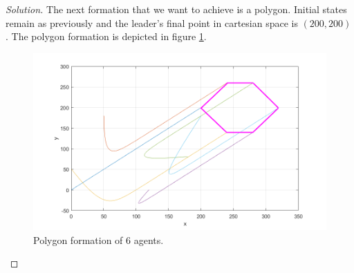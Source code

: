 \documentclass[12pt]{article}
\newenvironment{solution}{\begin{proof}[Solution]}{\end{proof}}
\begin{document}
\begin{solution}
The next formation that we want to achieve is a polygon. Initial states remain as previously and the leader's final point in cartesian space is $(200,200)$. The polygon formation is depicted in figure \ref{polygon_xy}.  
\begin{figure}[!h]
	\includegraphics[scale=0.6]{figures/PolygonFormation.png}
	\centering
	\caption{Polygon formation of 6 agents.}
	\label{polygon_xy}
\end{figure}


\end{solution}
\end{document}
